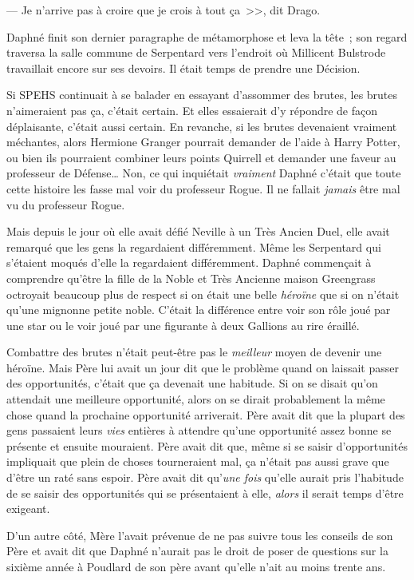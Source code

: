 --- Je n'arrive pas à croire que je crois à tout ça~>>, dit Drago.

\later

Daphné finit son dernier paragraphe de métamorphose et leva la tête~; son regard traversa la salle commune de Serpentard vers l'endroit où Millicent Bulstrode travaillait encore sur ses devoirs. Il était temps de prendre une Décision.

Si SPEHS continuait à se balader en essayant d'assommer des brutes, les brutes n'aimeraient pas ça, c'était certain. Et elles essaierait d'y répondre de façon déplaisante, c'était aussi certain. En revanche, si les brutes devenaient vraiment méchantes, alors Hermione Granger pourrait demander de l'aide à Harry Potter, ou bien ils pourraient combiner leurs points Quirrell et demander une faveur au professeur de Défense… Non, ce qui inquiétait \emph{vraiment} Daphné c'était que toute cette histoire les fasse mal voir du professeur Rogue. Il ne fallait \emph{jamais} être mal vu du professeur Rogue.

Mais depuis le jour où elle avait défié Neville à un Très Ancien Duel, elle avait remarqué que les gens la regardaient différemment. Même les Serpentard qui s'étaient moqués d'elle la regardaient différemment. Daphné commençait à comprendre qu'être la fille de la Noble et Très Ancienne maison Greengrass octroyait beaucoup plus de respect si on était une belle \emph{héroïne} que si on n'était qu'une mignonne petite noble. C'était la différence entre voir son rôle joué par une star ou le voir joué par une figurante à deux Gallions au rire éraillé.

Combattre des brutes n'était peut-être pas le \emph{meilleur} moyen de devenir une héroïne. Mais Père lui avait un jour dit que le problème quand on laissait passer des opportunités, c'était que ça devenait une habitude. Si on se disait qu'on attendait une meilleure opportunité, alors on se dirait probablement la même chose quand la prochaine opportunité arriverait. Père avait dit que la plupart des gens passaient leurs \emph{vies} entières à attendre qu'une opportunité assez bonne se présente et ensuite mouraient. Père avait dit que, même si se saisir d'opportunités impliquait que plein de choses tourneraient mal, ça n'était pas aussi grave que d'être un raté sans espoir. Père avait dit qu'\emph{une fois} qu'elle aurait pris l'habitude de se saisir des opportunités qui se présentaient à elle, \emph{alors} il serait temps d'être exigeant.

D'un autre côté, Mère l'avait prévenue de ne pas suivre tous les conseils de son Père et avait dit que Daphné n'aurait pas le droit de poser de questions sur la sixième année à Poudlard de son père avant qu'elle n'ait au moins trente ans.

